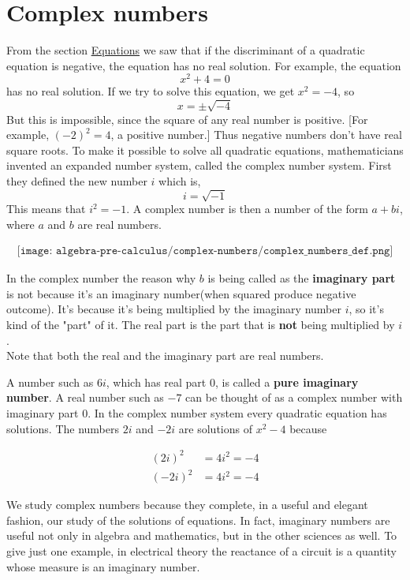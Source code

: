 \section{Complex numbers}

From the section \hyperref[sec:equations]{Equations} we saw that if the discriminant of a quadratic equation is negative, the
equation has no real solution. For example, the equation $$x^2+4=0$$ has no real solution. If we try to solve this equation, we get $x^2=-4$, so $$x=\pm \sqrt{-4}$$
But this is impossible, since the square of any real number is positive. [For example, $(-2)^2=4$, a positive number.] Thus negative numbers don’t have real square roots.
To make it possible to solve all quadratic equations, mathematicians invented an
expanded number system, called the complex number system. First they defined the new
number $i$ which is, $$i=\sqrt{-1}$$ This means that $i^2=-1$. A complex number is then a number of the form $a+bi$, where $a$ and $b$ are real numbers. 

\begin{align*}
    \texttt{[image: algebra-pre-calculus/complex-numbers/complex\_numbers\_def.png]}
\end{align*}

In the complex number the reason why $b$ is being called as the \textbf{imaginary part} is not because it's an imaginary number(when squared produce negative outcome). It's because it's being multiplied by the imaginary number $i$, so it's kind of the "part" of it. The real part is the part that is \textbf{not} being multiplied by $i$. \\

Note that both the real and the imaginary part are real numbers. 

A number such as $6i$, which has real part 0, is called a \textbf{pure imaginary number}. A
real number such as $-7$ can be thought of as a complex number with imaginary part 0.
In the complex number system every quadratic equation has solutions. The numbers
$2i$ and $-2i$ are solutions of $x^2-4$ because

\begin{align*}
    (2i)^2&=4i^2=-4 \\
    (-2i)^2&=4i^2=-4
\end{align*}

We study complex numbers because they complete, in a useful and elegant
fashion, our study of the solutions of equations. In fact, imaginary numbers are useful not
only in algebra and mathematics, but in the other sciences as well. To give just one example, in electrical theory the reactance of a circuit is a quantity whose measure is an
imaginary number. \\

